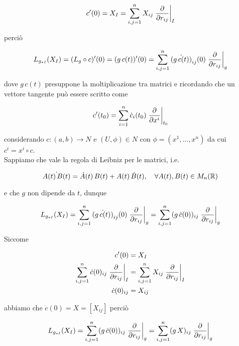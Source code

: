 \begin{equation}
	c'(0) = X_{I} = \sum_{i,j=1}^{n} X_{ij} \eval{ \pdv{r_{ij}} }_{I}
\end{equation}

perciò

\begin{equation}
	L_{g_{*I}}(X_{I}) = (L_{g} \circ c)'(0) %
	= (g \, c(t))'(0) %
	= \sum_{i,j=1}^{n} \dot{(g \, c(t))}_{ij}(0) \eval{ \pdv{r_{ij}} }_{g}
\end{equation}

dove $ g \, c(t) $ presuppone la moltiplicazione tra matrici e ricordando che un vettore tangente può essere scritto come

\begin{equation}
	c'(t_{0}) = \sum_{i=1}^{n} \dot{c}_{i}(t_{0}) \eval{ \pdv{x^{i}} }_{t_{0}}
\end{equation}

considerando $ c : (a,b) \to N $ e $ (U,\phi) \in N $ con $ \phi=(x^{1},\dots,x^{n}) $ da cui $ c^{i} = x^{i} \circ c $.\\
Sappiamo che vale la regola di Leibniz per le matrici, i.e.

\begin{equation}
	\dot{A(t) \, B(t)} = \dot{A}(t) \, B(t) + A(t) \, \dot{B}(t) \qcomma \forall A(t),B(t) \in M_{n}(\R)
\end{equation}

e che $ g $ non dipende da $ t $, dunque

\begin{equation}
	L_{g_{*I}}(X_{I}) = \sum_{i,j=1}^{n} \dot{(g \, c(t))}_{ij}(0) \eval{ \pdv{r_{ij}} }_{g} %
	= \sum_{i,j=1}^{n} (g \, \dot{c}(0))_{ij} \eval{ \pdv{r_{ij}} }_{g}
\end{equation}

Siccome

\begin{align}
	\begin{split}
		c'(0) &= X_{I}\\
		\sum_{i,j=1}^{n} \dot{c}(0)_{ij} \eval{ \pdv{r_{ij}} }_{I} &= \sum_{i,j=1}^{n} X_{ij} \eval{ \pdv{r_{ij}} }_{I}\\
		\dot{c}(0)_{ij} &= X_{ij}
	\end{split}
\end{align}

abbiamo che $ \dot{c}(0) = X = [X_{ij}] $ perciò

\begin{equation}
	L_{g_{*I}}(X_{I}) = \sum_{i,j=1}^{n} (g \, \dot{c}(0))_{ij} \eval{ \pdv{r_{ij}} }_{g} %
	= \sum_{i,j=1}^{n} (g \, X)_{ij} \eval{ \pdv{r_{ij}} }_{g}
\end{equation}

